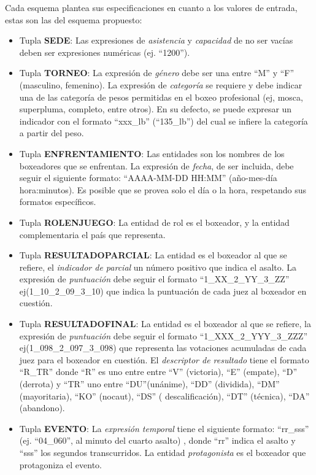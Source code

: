     Cada esquema plantea sus especificaciones en cuanto a los valores de entrada, estas son las del esquema propuesto:

    \begin{itemize}
        \item Tupla \textbf{SEDE}: Las expresiones de \textit{asistencia} y \textit{capacidad} de no ser vacías deben ser expresiones numéricas (ej. “1200”).
        \item Tupla \textbf{TORNEO}: La expresión de \textit{género} debe ser una entre “M” y “F” (masculino, femenino). La expresión de \textit{categoría} se requiere 
        y debe indicar una de las categoría de pesos permitidas en el boxeo profesional (ej, mosca, superpluma, completo, entre otros). En su defecto, se puede expresar un indicador con 
        el formato “xxx\_lb” (“135\_lb”) del cual se infiere la categoría a partir del peso.
        \item Tupla \textbf{ENFRENTAMIENTO}: Las entidades son los nombres de los boxeadores que se enfrentan. La expresión de \textit{fecha}, de ser incluida, debe seguir
        el siguiente formato: “AAAA-MM-DD HH:MM” (año-mes-día hora:minutos). Es posible que se provea solo el día o la hora, respetando sus formatos específicos.
        \item Tupla \textbf{ROLENJUEGO}: La entidad de rol es el boxeador, y la entidad complementaria el país que representa.
        \item Tupla \textbf{RESULTADOPARCIAL}: La entidad es el boxeador al que se refiere, el \textit{indicador de parcial} un número positivo que indica el asalto. La expresión de \textit{puntuación} 
        debe seguir el formato  “1\_XX\_2\_YY\_3\_ZZ” ej(1\_10\_2\_09\_3\_10) que indica la puntuación de cada juez al boxeador en cuestión.
        \item Tupla \textbf{RESULTADOFINAL}: La entidad es el boxeador al que se refiere, la expresión de \textit{puntuación} debe seguir el formato  “1\_XXX\_2\_YYY\_3\_ZZZ” ej(1\_098\_2\_097\_3\_098)
        que representa las votaciones acumuladas de cada juez para el boxeador en cuestión. El \textit{descriptor de resultado} tiene el formato “R\_TR” donde “R” es uno entre entre “V” (victoria), “E” (empate),
        “D” (derrota) y “TR” uno entre “DU”(unánime), “DD” (dividida), “DM” (mayoritaria), “KO” (nocaut), “DS” ( descalificación), “DT” (técnica), “DA” (abandono).
        \item Tupla \textbf{EVENTO}: La \textit{expresión temporal} tiene el siguiente formato: “rr\_sss” (ej. “04\_060”, al minuto del cuarto asalto) , donde “rr” indica el asalto y “sss” los segundos transcurridos. 
        La entidad \textit{protagonista} es el boxeador que protagoniza el evento.
    \end{itemize}


